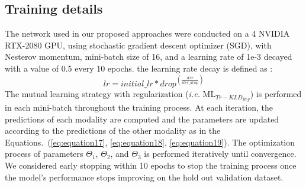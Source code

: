 \documentclass[twocolumn]{svjour3}
\newcommand{\ie}{\textit{i.e. }}
\begin{document}
\subsection{Training details} 

The network used in our proposed approaches were conducted on a 4 NVIDIA RTX-2080 GPU, using stochastic gradient descent optimizer (SGD), with Nesterov momentum, mini-batch size of 16, and a learning rate of 1e-3 decayed with a value of 0.5 every 10 epochs. the learning rate decay is defined as :
\begin{equation}
    lr = initial\_lr * drop^{\left(\frac{iter}{iter\_drop} \right)}
    \label{eq:equation21}
\end{equation}
The mutual learning strategy with regularization (\ie ML$_{{Tr-KLD}_{Reg}}$) is performed in each mini-batch throughout the training process. At each iteration, the predictions of each modality are computed and the parameters are updated according to the predictions of the other modality as in the Equations.~(\ref{eq:equation17}, \ref{eq:equation18}, \ref{eq:equation19}). The optimization process of parameters $\Theta_1$, $\Theta_2$, and $\Theta_3$ is performed iteratively until convergence. We considered early stopping within 10 epochs to stop the training process once the model's performance stops improving on the hold out validation dataset.
\end{document}
